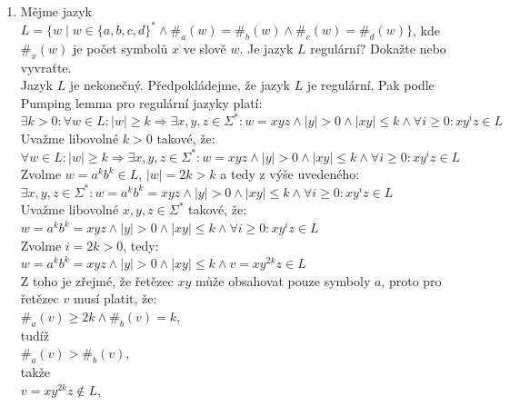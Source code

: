 \documentclass[a4paper,11pt]{article}[24.3.2010]
\begin{document}
\begin{enumerate}
\begin{itemize}
\end{itemize}

\newpage

  \item Mějme jazyk $L=\{w\mid w \in \{a,b,c,d\}^{*} \wedge \#_{a}(w) = \#_{b}(w) \wedge \#_{c}(w) = \#_{d}(w)\}$, kde $\#_{x}(w)$ je počet symbolů $x$ ve slově $w$. Je jazyk $L$ regulární? Dokažte nebo vyvraťte.\\

Jazyk $L$ je nekonečný. Předpokládejme, že jazyk $L$ je regulární. Pak podle Pumping lemma pro regulární jazyky platí:\\
$\exists k > 0: \forall w \in L: |w| \geq k \Rightarrow \exists x,y,z \in \Sigma^{*}: w = xyz \wedge |y| > 0 \wedge |xy| \leq k \wedge \forall i \geq 0: xy^{i}z \in L$\\

Uvažme libovolné $k > 0$ takové, že:\\
$\forall w \in L: |w| \geq k \Rightarrow \exists x,y,z \in \Sigma^{*}: w = xyz \wedge |y| > 0 \wedge |xy| \leq k \wedge \forall i \geq 0: xy^{i}z \in L$\\

Zvolme $w=a^{k}b^{k} \in L$, $|w| = 2k > k$ a tedy z výše uvedeného:\\
$\exists x,y,z \in \Sigma^{*}: w=a^{k}b^{k} = xyz \wedge |y| > 0 \wedge |xy| \leq k \wedge \forall i \geq 0: xy^{i}z \in L$\\

Uvažme libovolné $x,y,z \in \Sigma^{*}$ takové, že:\\
$w = a^{k}b^{k} = xyz \wedge |y| > 0 \wedge |xy| \leq k \wedge \forall i \geq 0: xy^{i}z \in L$\\

Zvolme $i=2k> 0$, tedy:\\
$w = a^{k}b^{k} = xyz \wedge |y| > 0 \wedge |xy| \leq k \wedge v = xy^{2k}z \in L$\\

Z toho je zřejmé, že řetězec $xy$ může obsahovat pouze symboly $a$, proto pro řetězec $v$ musí platit, že:\\
$\#_{a}(v) \geq 2k \wedge \#_{b}(v) = k$,\\

tudíž\\ 
$\#_{a}(v) > \#_{b}(v)$,\\

takže\\
$v = xy^{2k}z \notin L$,\\


\end{enumerate}
\end{document}
